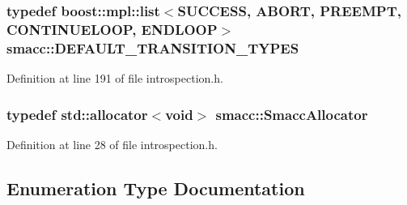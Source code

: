 \subsubsection[{\texorpdfstring{D\+E\+F\+A\+U\+L\+T\+\_\+\+T\+R\+A\+N\+S\+I\+T\+I\+O\+N\+\_\+\+T\+Y\+P\+ES}{DEFAULT_TRANSITION_TYPES}}]{\setlength{\rightskip}{0pt plus 5cm}typedef boost\+::mpl\+::list$<${\bf S\+U\+C\+C\+E\+SS}, {\bf A\+B\+O\+RT}, {\bf P\+R\+E\+E\+M\+PT}, {\bf C\+O\+N\+T\+I\+N\+U\+E\+L\+O\+OP}, {\bf E\+N\+D\+L\+O\+OP}$>$ {\bf smacc\+::\+D\+E\+F\+A\+U\+L\+T\+\_\+\+T\+R\+A\+N\+S\+I\+T\+I\+O\+N\+\_\+\+T\+Y\+P\+ES}}\hypertarget{namespacesmacc_a5238572f5e2747391ba919540aaf70bd}{}\label{namespacesmacc_a5238572f5e2747391ba919540aaf70bd}


Definition at line 191 of file introspection.\+h.

\subsubsection[{\texorpdfstring{Smacc\+Allocator}{SmaccAllocator}}]{\setlength{\rightskip}{0pt plus 5cm}typedef std\+::allocator$<$void$>$ {\bf smacc\+::\+Smacc\+Allocator}}\hypertarget{namespacesmacc_ac43548af6721e408234339fcf1ab1254}{}\label{namespacesmacc_ac43548af6721e408234339fcf1ab1254}


Definition at line 28 of file introspection.\+h.



\subsection{Enumeration Type Documentation}

